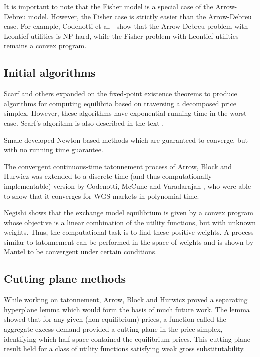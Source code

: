 \documentclass[12pt]{article}
\begin{document}
It is important to note that the Fisher model is a special case of the
Arrow-Debreu model. However, the Fisher case is strictly easier
 than the
Arrow-Debreu case. For example, Codenotti et al.\ \cite{codenotti2006leontief}
show that the Arrow-Debreu problem with Leontief utilities is NP-hard, while
the Fisher problem with Leontief utilities remains a convex program.

\subsection{Initial algorithms}

Scarf and others \cite{scarf2008applied,eaves1972homotopies,kuhn1968simplicial}
expanded on the fixed-point existence theorems to produce algorithms for
computing equilibria based on traversing a decomposed price simplex.
However, these algorithms have exponential running time in the worst case.
Scarf's algorithm is also described in the text \cite{shoven1992applying}.

Smale \cite{smale1976convergent, smale1976exchange} developed Newton-based
methods which are guaranteed to converge, but with no running time guarantee.

The convergent continuous-time tatonnement process of Arrow, Block and Hurwicz
\cite{arrow1959stability} was extended to a discrete-time
(and thus computationally implementable) version by Codenotti, McCune and
Varadarajan \cite{codenotti2005marketExcess}, who were able to show that it
converges for WGS markets in polynomial time.

Negishi \cite{negishi1960welfare} shows that the exchange model equilibrium is
given by a convex program whose objective is a linear combination of the
utility functions, but with unknown weights.
Thus, the computational task is to find these positive weights.
A process similar to tatonnement can be performed in the space of weights
and is shown by Mantel \cite{mantel1971welfare} to be convergent under certain
conditions.

\subsection{Cutting plane methods}
While working on tatonnement, Arrow, Block and Hurwicz \cite{arrow1959stability}
proved a separating hyperplane lemma which would form the basis of much future
work.
The lemma showed that for any given (non-equilibrium) prices, a function called
the aggregate excess demand provided a cutting plane in the price simplex,
identifying which half-space contained the equilibrium prices.
This cutting plane result held for a class of utility functions satisfying
weak gross substitutability.
\end{document}
